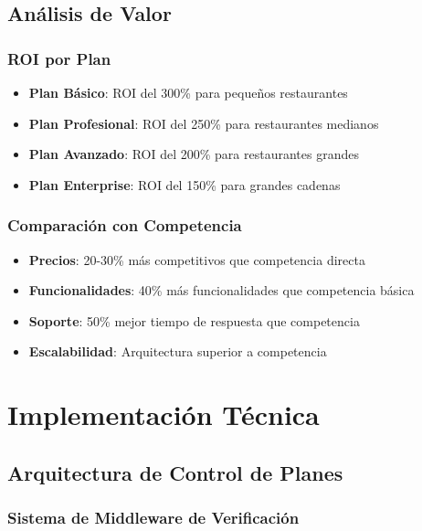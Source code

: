 \documentclass[12pt,a4paper]{article}
\begin{document}
\subsection{Análisis de Valor}

\subsubsection{ROI por Plan}

\begin{itemize}
    \item \textbf{Plan Básico}: ROI del 300\% para pequeños restaurantes
    \item \textbf{Plan Profesional}: ROI del 250\% para restaurantes medianos
    \item \textbf{Plan Avanzado}: ROI del 200\% para restaurantes grandes
    \item \textbf{Plan Enterprise}: ROI del 150\% para grandes cadenas
\end{itemize}

\subsubsection{Comparación con Competencia}

\begin{itemize}
    \item \textbf{Precios}: 20-30\% más competitivos que competencia directa
    \item \textbf{Funcionalidades}: 40\% más funcionalidades que competencia básica
    \item \textbf{Soporte}: 50\% mejor tiempo de respuesta que competencia
    \item \textbf{Escalabilidad}: Arquitectura superior a competencia
\end{itemize}

\section{Implementación Técnica}

\subsection{Arquitectura de Control de Planes}

\subsubsection{Sistema de Middleware de Verificación}
\end{document}
